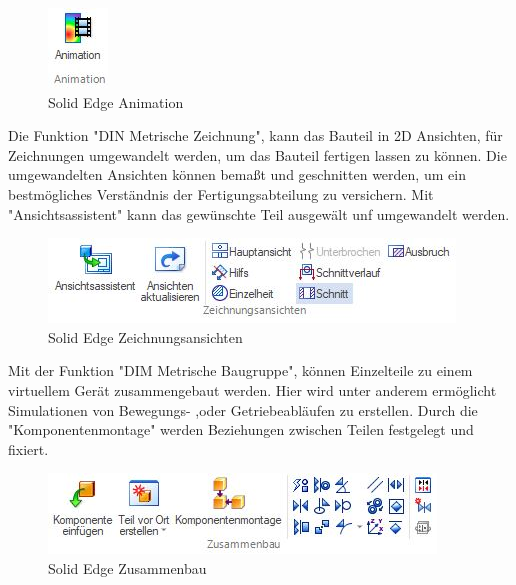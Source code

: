\begin{figure} [H]
	\begin{center}
		\includegraphics[scale=0.4]{figures/mechanik/Solid Edge_Animation.jpg}
			\caption{Solid Edge Animation}
			\label{fig:Solid Edge Animation}
	\end{center}
\end{figure}


Die Funktion "DIN Metrische Zeichnung", kann das Bauteil in 2D Ansichten, für Zeichnungen umgewandelt werden, um das Bauteil fertigen lassen zu können. Die umgewandelten Ansichten können bemaßt und geschnitten werden, um ein bestmögliches Verständnis der Fertigungsabteilung zu versichern. Mit "Ansichtsassistent" kann das gewünschte Teil ausgewält unf umgewandelt werden.


\begin{figure} [H]
	\begin{center}
		\includegraphics[scale=0.4]{figures/mechanik/Solid Edge_Zeichnungsansichten.jpg}
			\caption{Solid Edge Zeichnungsansichten}
			\label{fig:Solid Edge Zeichnungsansichten}
	\end{center}
\end{figure}


Mit der Funktion "DIM Metrische Baugruppe", können Einzelteile zu einem virtuellem Gerät zusammengebaut werden. Hier wird unter anderem ermöglicht Simulationen von Bewegungs- ,oder Getriebeabläufen zu erstellen. Durch die "Komponentenmontage" werden Beziehungen zwischen Teilen festgelegt und fixiert.

\begin{figure} [H]
	\begin{center}
		\includegraphics[scale=0.5]{figures/mechanik/Solid Edge_Zusammenbau.jpg}
			\caption{Solid Edge Zusammenbau}
			\label{fig:Solid Edge Zusammenbau}
	\end{center}
\end{figure}

